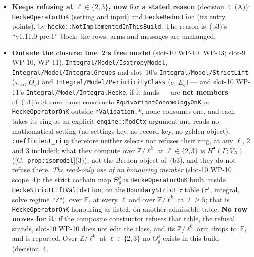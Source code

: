 \documentclass[11pt]{article}
\theoremstyle{remark}
\newcommand{\F}{\mathbb{F}}
\newcommand{\Z}{\mathbb{Z}}
\newcommand{\Ga}{\Gamma}
\newcommand{\Fl}{\F_\ell}
\newcommand{\HA}[1]{[C,~\texttt{#1}]}      %
\begin{document}
\begin{enumerate}[label=(b\arabic*)]
\begin{itemize}
    member; rows run concurrently, every key and program the serial loop's, and the E8 golden
    points, computed through it over the ring, unchanged under \texttt{GOLDEN\_STRICT=1}), and the
    $\iota$ lever in \texttt{HeckeInvolution} (a refusing member; only the order of independent
    checks on its field path, its guard and arm untouched). Evidence: the status paragraph's lane~B.
  \item \textbf{Keeps refusing at $\ell\in\{2,3\}$, now for a stated reason} (decision~4~(A)):
    \texttt{HeckeOperatorOnK} (setting and input) and \texttt{HeckeReduction} (its entry points),
    by \texttt{hecke::NotImplementedInThisBuild}. The reason is~(b3)'s ``v1.11.0-pre.1'' block;
    the rows, arms and messages are unchanged.
  \item \textbf{Outside the closure: line~2's free model} (slot-10 WP-10, WP-13; slot-9 WP-10,
    WP-11). \texttt{Integral/Model/IsotropyModel}, \texttt{Integral/Model/IntegralGroups} and
    slot~10's \texttt{Integral/Model/StrictLift} ($\tau_{\mathrm{Iso}}$, $\widehat\Theta_g$) and
    \texttt{Integral/Model/PeriodicityClass} ($e$, $E_q$) --- and slot-10 WP-11's
    \texttt{Integral/Model/IntegralHecke}, if it lands --- are \textbf{not members} of~(b1)'s
    closure: none constructs \texttt{EquivariantCohomologyOnK} or \texttt{HeckeOperatorOnK} outside
    \texttt{*Validation.*}, none consumes one, and each takes its ring as an explicit
    \texttt{engine::ModCtx} argument and reads no mathematical setting (no settings key, no record
    key, no golden object). \texttt{coefficient\_ring} therefore neither selects nor refuses their
    ring, at any $\ell$, $2$ and $3$ included; what they compute over $\Z/\ell^k$ at $\ell\in\{2,3\}$
    is $H^{\bullet}(\Ga;V_R)$ (\HA{prop:isomodel}(3)), not the Bredon object of~(b3), and they do
    not refuse there. \emph{The read-only use of an honouring member} (slot-10 WP-10 scope~4): the
    strict cochain map $\Theta^{s}_g$ is \texttt{HeckeOperatorOnK} built, inside
    \texttt{HeckeStrictLiftValidation}, on the \texttt{BoundaryStrict} $\tau$ table ($\tau^{s}$,
    integral, solve regime \texttt{"Z"}), over $\Fl$ at every $\ell$ and over $\Z/\ell^k$ at
    $\ell\ge5$; that is \texttt{HeckeOperatorOnK} honouring as listed, on another admissible table.
    \textbf{No row moves for it}: if the composite constructor refuses that table, the refusal
    stands, slot-10 WP-10 does not edit the class, and its $\Z/\ell^k$ arm drops to~$\Fl$ and is
    reported. Over $\Z/\ell^k$ at $\ell\in\{2,3\}$ no $\Theta^{s}_g$ exists in this build (decision~4,

\end{itemize}
\end{enumerate}
\end{document}
